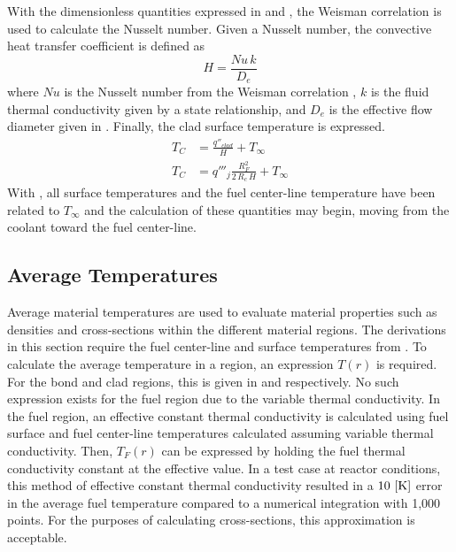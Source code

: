       With the dimensionless quantities expressed in  and
      , the Weisman correlation is used to calculate the Nusselt
      number. Given a Nusselt number, the convective heat transfer coefficient
      is defined as
      \begin{equation}
        \label{eq:hc}
        H = \frac{Nu \, k}{D_e}
      \end{equation}
      where $Nu$ is the Nusselt number from the Weisman correlation
      , $k$ is the fluid thermal conductivity given by a state
      relationship, and $D_e$ is the effective flow diameter given in
      . Finally, the clad surface temperature is expressed.
      \begin{align}
        T_C &= \frac{q''_{clad}}{H} + T_{\infty} \\
        \label{eq:tc}
        T_C &= q'''_j \frac{R_F^2}{2\,R_c\,H} + T_{\infty}
      \end{align}
      With , all surface temperatures and the fuel center-line
      temperature have been related to $T_{\infty}$ and the calculation of these
      quantities may begin, moving from the coolant toward the fuel center-line.

  \subsection{Average Temperatures}
    \label{sec:average_temps}
    Average material temperatures are used to evaluate material properties such
    as densities and cross-sections within the different material regions. The
    derivations in this section require the fuel center-line and surface
    temperatures from . To calculate the average
    temperature in a region, an expression $T(r)$ is required. For the bond and
    clad regions, this is given in  and  respectively.
    No such expression exists for the fuel region due to the variable thermal
    conductivity. In the fuel region, an effective constant thermal conductivity
    is calculated using fuel surface and fuel center-line temperatures
    calculated assuming variable thermal conductivity. Then, $T_F(r)$ can be 
    expressed by holding the fuel thermal conductivity constant at the effective
    value. In a test case at reactor conditions, this method of effective 
    constant thermal conductivity resulted in a $10 \,\left[\text{{K}}\right]$ error in the 
    average fuel temperature compared to a numerical integration with 1,000
    points. For the purposes of calculating cross-sections, this approximation
    is acceptable.

